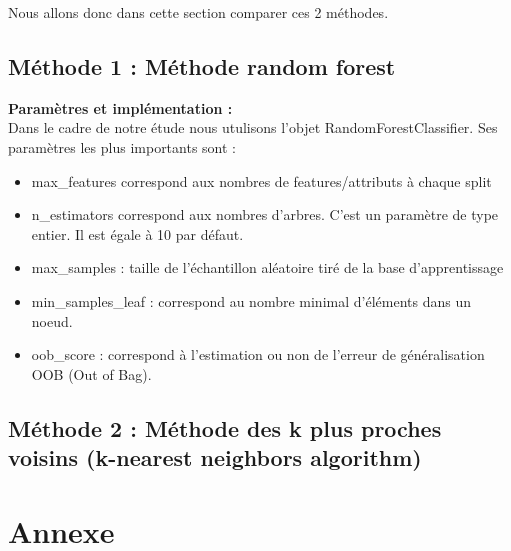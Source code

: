 \documentclass[11pt]{article}
\begin{document}
Nous allons donc dans cette section comparer ces 2 méthodes.







\subsection{Méthode 1 : Méthode random forest}

\textbf{Paramètres et implémentation :} \\


Dans le cadre de notre étude nous utulisons l'objet RandomForestClassifier. Ses paramètres les plus importants sont :
\begin{itemize}
    \item max\_features correspond aux nombres de features/attributs à chaque split
    \item n\_estimators correspond aux nombres d'arbres. C'est un paramètre de type entier. Il est égale à 10 par défaut.
    \item max\_samples : taille de l'échantillon aléatoire tiré de la base d'apprentissage
    \item min\_samples\_leaf : correspond au nombre minimal d'éléments  dans un noeud.
    \item oob\_score : correspond à l'estimation ou non de l’erreur de généralisation OOB (Out of Bag).
\end{itemize}

\subsection{Méthode 2 : Méthode des k plus proches voisins (k-nearest neighbors algorithm)}

\section{Annexe}

\newpage
\printbibliography[
heading=bibintoc,
] %
\end{document}
